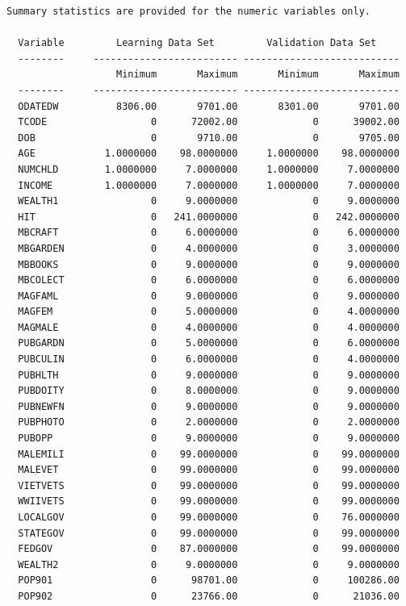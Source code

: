 \documentclass[
  11pt,
  a4paper,
  DIV=12,captions=tableheading,oneside,titlepage]{scrbook}
\begin{document}
\begin{verbatim}
Summary statistics are provided for the numeric variables only. 

  Variable         Learning Data Set         Validation Data Set 
  --------     ------------------------- --------------------------- 
                   Minimum       Maximum       Minimum       Maximum 
  --------     ------------------------- --------------------------- 
  ODATEDW          8306.00       9701.00       8301.00       9701.00 
  TCODE                  0      72002.00             0      39002.00 
  DOB                    0       9710.00             0       9705.00 
  AGE            1.0000000    98.0000000     1.0000000    98.0000000 
  NUMCHLD        1.0000000     7.0000000     1.0000000     7.0000000 
  INCOME         1.0000000     7.0000000     1.0000000     7.0000000 
  WEALTH1                0     9.0000000             0     9.0000000 
  HIT                    0   241.0000000             0   242.0000000 
  MBCRAFT                0     6.0000000             0     6.0000000 
  MBGARDEN               0     4.0000000             0     3.0000000 
  MBBOOKS                0     9.0000000             0     9.0000000 
  MBCOLECT               0     6.0000000             0     6.0000000 
  MAGFAML                0     9.0000000             0     9.0000000 
  MAGFEM                 0     5.0000000             0     4.0000000 
  MAGMALE                0     4.0000000             0     4.0000000 
  PUBGARDN               0     5.0000000             0     6.0000000 
  PUBCULIN               0     6.0000000             0     4.0000000 
  PUBHLTH                0     9.0000000             0     9.0000000 
  PUBDOITY               0     8.0000000             0     9.0000000 
  PUBNEWFN               0     9.0000000             0     9.0000000 
  PUBPHOTO               0     2.0000000             0     2.0000000 
  PUBOPP                 0     9.0000000             0     9.0000000 
  MALEMILI               0    99.0000000             0    99.0000000 
  MALEVET                0    99.0000000             0    99.0000000 
  VIETVETS               0    99.0000000             0    99.0000000 
  WWIIVETS               0    99.0000000             0    99.0000000 
  LOCALGOV               0    99.0000000             0    76.0000000 
  STATEGOV               0    99.0000000             0    99.0000000 
  FEDGOV                 0    87.0000000             0    99.0000000 
  WEALTH2                0     9.0000000             0     9.0000000 
  POP901                 0      98701.00             0     100286.00 
  POP902                 0      23766.00             0      21036.00 

\end{verbatim}
\end{document}
